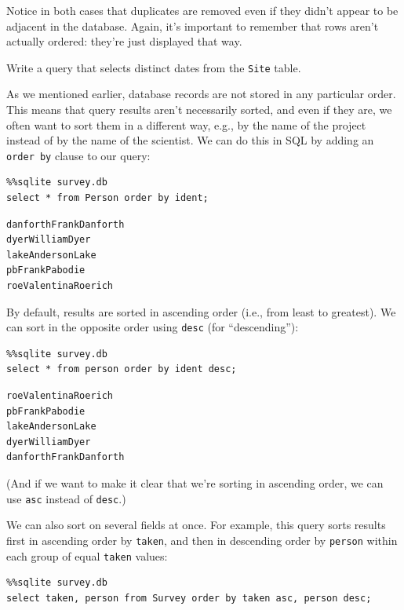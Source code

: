 \documentclass{book}
\begin{document}
Notice in both cases that duplicates are removed even if they didn't
appear to be adjacent in the database. Again, it's important to remember
that rows aren't actually ordered: they're just displayed that way.

\begin{challenge}
  Write a query that selects distinct dates from the \texttt{Site}
  table.
\end{challenge}

As we mentioned earlier, database records are not stored in any
particular order. This means that query results aren't necessarily
sorted, and even if they are, we often want to sort them in a different
way, e.g., by the name of the project instead of by the name of the
scientist. We can do this in SQL by adding an \texttt{order by} clause
to our query:

\begin{verbatim}
%%sqlite survey.db
select * from Person order by ident;
\end{verbatim}

\begin{verbatim}
danforthFrankDanforth
dyerWilliamDyer
lakeAndersonLake
pbFrankPabodie
roeValentinaRoerich
\end{verbatim}

By default, results are sorted in ascending order (i.e., from least to
greatest). We can sort in the opposite order using \texttt{desc} (for
``descending''):

\begin{verbatim}
%%sqlite survey.db
select * from person order by ident desc;
\end{verbatim}

\begin{verbatim}
roeValentinaRoerich
pbFrankPabodie
lakeAndersonLake
dyerWilliamDyer
danforthFrankDanforth
\end{verbatim}

(And if we want to make it clear that we're sorting in ascending order,
we can use \texttt{asc} instead of \texttt{desc}.)

We can also sort on several fields at once. For example, this query
sorts results first in ascending order by \texttt{taken}, and then in
descending order by \texttt{person} within each group of equal
\texttt{taken} values:

\begin{verbatim}
%%sqlite survey.db
select taken, person from Survey order by taken asc, person desc;
\end{verbatim}
\end{document}
